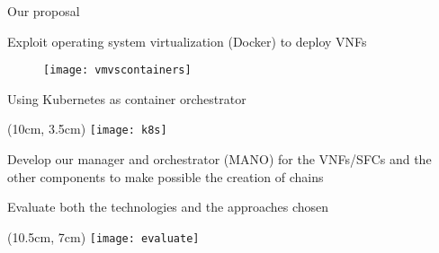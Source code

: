 \begin{frame}{Our proposal}

  \vspace*{-0.2cm}

  Exploit operating system virtualization (Docker) to deploy VNFs

  \begin{figure}
    \centering
    \texttt{[image: vmvscontainers]}
  \end{figure}

  Using Kubernetes as container orchestrator

  \vspace{1cm}

  \begin{textblock*}{1cm}(10cm, 3.5cm)
    \texttt{[image: k8s]}
  \end{textblock*}

  Develop our manager and orchestrator (MANO) for the VNFs/SFCs and the other
  components to make possible the creation of chains

  \vspace{1cm}

  Evaluate both the technologies and the approaches chosen

  \vspace{1cm}

  \begin{textblock*}{1cm}(10.5cm, 7cm)
    \texttt{[image: evaluate]}
  \end{textblock*}

\end{frame}